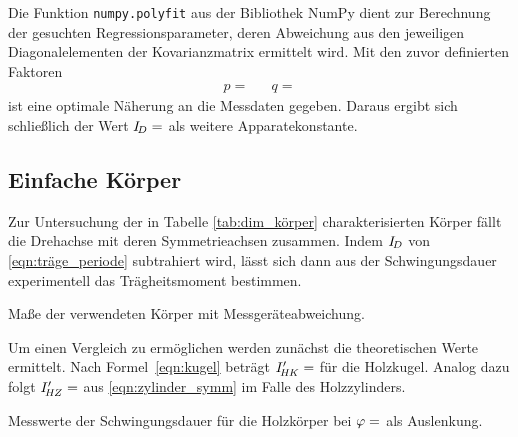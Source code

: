 Die Funktion \verb+numpy.polyfit+ aus der Bibliothek NumPy \cite{numpy} dient zur Berechnung der gesuchten
Regressionsparameter, deren Abweichung aus den jeweiligen Diagonalelementen der Kovarianzmatrix ermittelt wird.
Mit den zuvor definierten Faktoren
\begin{align*}
	p =  && q = 
\end{align*}
ist eine optimale Näherung an die Messdaten gegeben. Daraus ergibt sich schließlich der Wert
$I_{\hspace{-0.3ex}D} = $ als weitere Apparatekonstante.

\subsection{Einfache Körper}

Zur Untersuchung der in Tabelle \ref{tab:dim_körper} charakterisierten Körper fällt die Drehachse mit deren
Symmetrieachsen zusammen. Indem $I_{\hspace{-0.3ex}D}$ von \eqref{eqn:träge_periode} subtrahiert wird, lässt
sich dann aus der Schwingungsdauer experimentell das Trägheitsmoment bestimmen.

\begin{table}
	\centering
	\caption{Maße der verwendeten Körper mit Messgeräteabweichung.}
	
	\label{tab:dim_körper}
\end{table}

Um einen Vergleich zu ermöglichen werden zunächst die theoretischen Werte ermittelt. Nach Formel~\eqref{eqn:kugel}
beträgt $I'_{\hspace{-0.3ex}H\hspace{-0.15ex}K} = $ für die Holzkugel. Analog dazu folgt
$I'_{\hspace{-0.3ex}H\hspace{-0.15ex}Z} = $ aus \eqref{eqn:zylinder_symm} im Falle
des Holzzylinders.

\begin{table}
	\centering
	\captionsetup{width=0.65\linewidth}
	\caption{Messwerte der Schwingungsdauer für die Holzkörper bei
			 $\varphi = \protect$ als Auslenkung.}
	
	\label{tab:period_körper}
\end{table}

